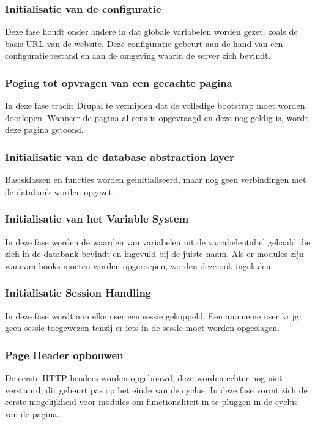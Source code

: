 \subsubsection{Initialisatie van de configuratie}
Deze fase houdt onder andere in dat globale variabelen worden gezet, zoals de basis URL van de website. Deze configuratie gebeurt aan de hand van een configuratiebestand en aan de omgeving waarin de server zich bevindt.

\subsubsection{Poging tot opvragen van een gecachte pagina}
In deze fase tracht Drupal te vermijden dat de volledige bootstrap moet worden doorlopen. Wanneer de pagina al eens is opgevraagd en deze nog geldig is, wordt deze pagina getoond.

\subsubsection{Initialisatie van de database abstraction layer}
Basisklassen en functies worden geinitialiseerd, maar nog geen verbindingen met de databank worden opgezet.

\subsubsection{Initialisatie van het Variable System}
In deze fase worden de waarden van variabelen uit de variabelentabel gehaald die zich in de databank bevindt en ingevuld bij de juiste naam. Als er modules zijn waarvan hooks moeten worden opgeroepen, worden deze ook ingeladen.

\subsubsection{Initialisatie Session Handling}
In deze fase wordt aan elke user een sessie gekoppeld. Een anonieme user krijgt geen sessie toegewezen tenzij er iets in de sessie moet worden opgeslagen.

\subsubsection{Page Header opbouwen}
De eerste HTTP headers worden opgebouwd, deze worden echter nog niet verstuurd, dit gebeurt pas op het einde van de cyclus. In deze fase vormt zich de eerste mogelijkheid voor modules om functionaliteit in te pluggen in de cyclus van de pagina.


